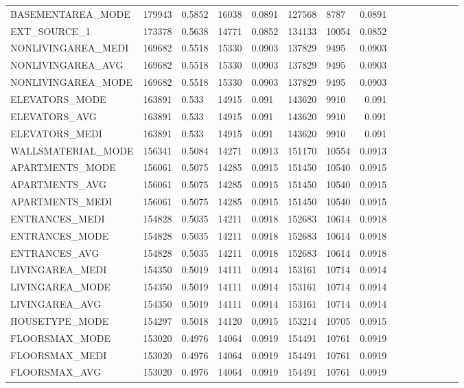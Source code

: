 \documentclass[12pt, letterpaper]{article}
\begin{document}
\begin{appendices}
{\begin{longtable}[c]{| l || Rm{1.3cm} | Rm{1.3cm} | Rm{1.3cm} | Rm{1.3cm} | Rm{1.3cm} | Rm{1.3cm} | Rm{1.3cm} |}
BASEMENTAREA_MODE	&	179943	&	0.5852	&	16038	&	0.0891	&	127568	&	8787	&	0.0891	\\
EXT_SOURCE_1	&	173378	&	0.5638	&	14771	&	0.0852	&	134133	&	10054	&	0.0852	\\
NONLIVINGAREA_MEDI	&	169682	&	0.5518	&	15330	&	0.0903	&	137829	&	9495	&	0.0903	\\
NONLIVINGAREA_AVG	&	169682	&	0.5518	&	15330	&	0.0903	&	137829	&	9495	&	0.0903	\\
NONLIVINGAREA_MODE	&	169682	&	0.5518	&	15330	&	0.0903	&	137829	&	9495	&	0.0903	\\
ELEVATORS_MODE	&	163891	&	0.533	&	14915	&	0.091	&	143620	&	9910	&	0.091	\\
ELEVATORS_AVG	&	163891	&	0.533	&	14915	&	0.091	&	143620	&	9910	&	0.091	\\
ELEVATORS_MEDI	&	163891	&	0.533	&	14915	&	0.091	&	143620	&	9910	&	0.091	\\
WALLSMATERIAL_MODE	&	156341	&	0.5084	&	14271	&	0.0913	&	151170	&	10554	&	0.0913	\\
APARTMENTS_MODE	&	156061	&	0.5075	&	14285	&	0.0915	&	151450	&	10540	&	0.0915	\\
APARTMENTS_AVG	&	156061	&	0.5075	&	14285	&	0.0915	&	151450	&	10540	&	0.0915	\\
APARTMENTS_MEDI	&	156061	&	0.5075	&	14285	&	0.0915	&	151450	&	10540	&	0.0915	\\
ENTRANCES_MEDI	&	154828	&	0.5035	&	14211	&	0.0918	&	152683	&	10614	&	0.0918	\\
ENTRANCES_MODE	&	154828	&	0.5035	&	14211	&	0.0918	&	152683	&	10614	&	0.0918	\\
ENTRANCES_AVG	&	154828	&	0.5035	&	14211	&	0.0918	&	152683	&	10614	&	0.0918	\\
LIVINGAREA_MEDI	&	154350	&	0.5019	&	14111	&	0.0914	&	153161	&	10714	&	0.0914	\\
LIVINGAREA_MODE	&	154350	&	0.5019	&	14111	&	0.0914	&	153161	&	10714	&	0.0914	\\
LIVINGAREA_AVG	&	154350	&	0.5019	&	14111	&	0.0914	&	153161	&	10714	&	0.0914	\\
HOUSETYPE_MODE	&	154297	&	0.5018	&	14120	&	0.0915	&	153214	&	10705	&	0.0915	\\
FLOORSMAX_MODE	&	153020	&	0.4976	&	14064	&	0.0919	&	154491	&	10761	&	0.0919	\\
FLOORSMAX_MEDI	&	153020	&	0.4976	&	14064	&	0.0919	&	154491	&	10761	&	0.0919	\\
FLOORSMAX_AVG	&	153020	&	0.4976	&	14064	&	0.0919	&	154491	&	10761	&	0.0919	\\

\end{longtable}}
\end{appendices}
\end{document}
